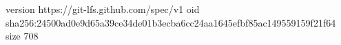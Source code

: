 version https://git-lfs.github.com/spec/v1
oid sha256:24500ad0e9d65a39ce34de01b3ecba6cc24aa1645efbf85ac149559159f21f64
size 708
